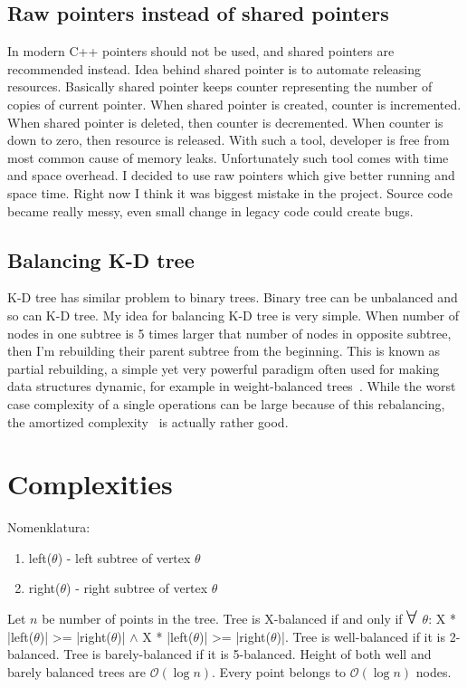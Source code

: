 \documentclass[10pt,a4paper]{article}
\newcommand{\Oh}{\mathcal{O}}
\newcommand\bigforall{\mbox{\Large $\mathsurround0pt\forall$}}
\begin{document}
\subsection{Raw pointers instead of shared pointers}

In modern C++ pointers should not be used, and shared pointers are recommended instead. Idea behind shared pointer is to automate releasing resources. Basically shared pointer keeps counter representing the number of copies of current pointer. When shared pointer is created, counter is incremented. When shared pointer is deleted, then counter is decremented. When counter is down to zero, then resource is released. With such a tool, developer is free from most common cause of memory leaks. Unfortunately such tool comes with time and space overhead. I decided to use raw pointers which give better running and space time.
Right now I think it was biggest mistake in the project. Source code became really messy, even small change in legacy code could create bugs.

\subsection{Balancing K-D tree}
K-D tree has similar problem to binary trees. Binary tree can be unbalanced and so can K-D tree. My idea for balancing K-D tree is very simple. When number of nodes in one subtree is 5 times larger that number of nodes in opposite subtree, then I'm rebuilding their parent subtree from the beginning.
This is known as partial rebuilding, a simple yet very powerful paradigm often used for making data structures dynamic, for example in weight-balanced trees~\cite{ALPHATREES}. While the worst case complexity of a single operations can be large because of this rebalancing, the amortized complexity~\cite{AMOR} is actually rather good.


\section{Complexities}

Nomenklatura:
\begin{enumerate}
\item left($\theta$) - left subtree of vertex $\theta$
\item right($\theta$) - right subtree of vertex $\theta$
\end{enumerate}

Let $n$ be number of points in the tree. Tree is X-balanced if and only if $\bigforall$ $\theta$: X * |left($\theta$)| >= |right($\theta$)| $\wedge$ X * |left($\theta$)| >= |right($\theta$)|. Tree is well-balanced if it is 2-balanced. Tree is barely-balanced if it is 5-balanced. Height of both well and barely balanced trees are $\Oh(\log n)$. Every point belongs to $\Oh(\log n)$ nodes. 
\end{document}
